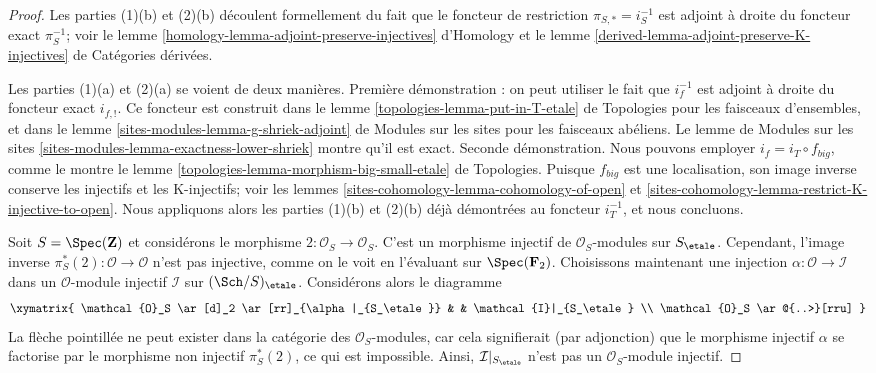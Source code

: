 \begin{proof}
Les parties (1)(b) et (2)(b)
découlent formellement du fait que le foncteur de restriction
$\pi_{S, *} = i_S^{-1}$ est adjoint à droite du foncteur exact
$\pi_S^{-1}$; voir le
lemme \ref{homology-lemma-adjoint-preserve-injectives} d'Homology et le
lemme \ref{derived-lemma-adjoint-preserve-K-injectives} de Catégories dérivées.

\medskip\noindent
Les parties (1)(a) et (2)(a) se voient de deux manières. Première démonstration : on peut utiliser
le fait que $i_f^{-1}$ est adjoint à droite du foncteur exact $i_{f, !}$.
Ce foncteur est construit dans le
lemme \ref{topologies-lemma-put-in-T-etale} de Topologies
pour les faisceaux d'ensembles, et dans le
lemme \ref{sites-modules-lemma-g-shriek-adjoint} de Modules sur les sites pour les faisceaux abéliens.
Le lemme de Modules sur les sites
\ref{sites-modules-lemma-exactness-lower-shriek} montre qu'il est exact.
Seconde démonstration. Nous pouvons employer $i_f = i_T \circ f_{big}$, comme le montre
le lemme \ref{topologies-lemma-morphism-big-small-etale} de Topologies.
Puisque $f_{big}$ est une localisation, son image inverse
conserve les injectifs et les K-injectifs; voir les
lemmes \ref{sites-cohomology-lemma-cohomology-of-open} et
\ref{sites-cohomology-lemma-restrict-K-injective-to-open}.
Nous appliquons alors les parties (1)(b) et (2)(b) déjà démontrées
au foncteur $i_T^{-1}$, et nous concluons.

\medskip\noindent
Soit $S = \Spec(\mathbf{Z})$ et considérons le morphisme
$2 : \mathcal{O}_S \to \mathcal{O}_S$. C'est un morphisme injectif
de $\mathcal{O}_S$-modules sur $S_\etale$. Cependant, l'image inverse
$\pi_S^*(2) : \mathcal{O} \to \mathcal{O}$ n'est pas injective,
comme on le voit en l'évaluant sur $\Spec(\mathbf{F}_2)$. Choisissons maintenant
une injection $\alpha : \mathcal{O} \to \mathcal{I}$ dans un
$\mathcal{O}$-module injectif $\mathcal{I}$ sur $(\Sch/S)_\etale$.
Considérons alors le diagramme
$$
\xymatrix{
\mathcal{O}_S \ar[d]_2 \ar[rr]_{\alpha|_{S_\etale}} & &
\mathcal{I}|_{S_\etale} \\
\mathcal{O}_S \ar@{..>}[rru]
}
$$
La flèche pointillée ne peut exister dans la catégorie des $\mathcal{O}_S$-modules,
car cela signifierait
(par adjonction) que le morphisme injectif $\alpha$ se factorise par
le morphisme non injectif $\pi_S^*(2)$, ce qui est impossible.
Ainsi, $\mathcal{I}|_{S_\etale}$ n'est pas un $\mathcal{O}_S$-module injectif.
\end{proof}

